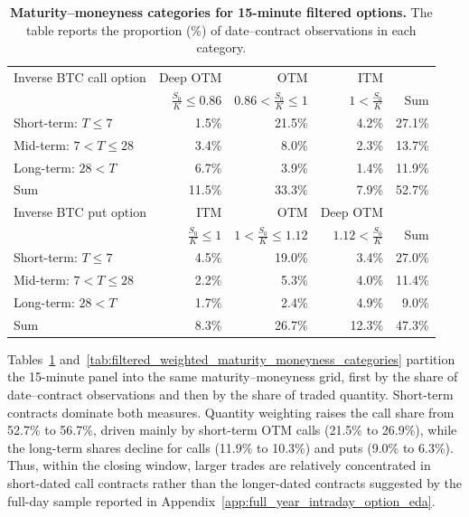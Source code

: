 \begin{table}[htbp]
\centering
\begin{tabular}{lrrrr}
\hline
Inverse BTC call option & Deep OTM & OTM & ITM & \\
 & $\frac{S_0}{K} \leq 0.86$ & $0.86 < \frac{S_0}{K} \leq 1$ & $1 < \frac{S_0}{K}$ & Sum \\
\hline
Short-term: $T \leq 7$ & 1.5\% & 21.5\% & 4.2\% & 27.1\% \\
Mid-term: $7 < T \leq 28$ & 3.4\% & 8.0\% & 2.3\% & 13.7\% \\
Long-term: $28 < T$ & 6.7\% & 3.9\% & 1.4\% & 11.9\% \\
Sum & 11.5\% & 33.3\% & 7.9\% & 52.7\% \\
\hline
Inverse BTC put option & ITM & OTM & Deep OTM & \\
 & $\frac{S_0}{K} \leq 1$ & $1 < \frac{S_0}{K} \leq 1.12$ & $1.12 < \frac{S_0}{K}$ & Sum \\
\hline
Short-term: $T \leq 7$ & 4.5\% & 19.0\% & 3.4\% & 27.0\% \\
Mid-term: $7 < T \leq 28$ & 2.2\% & 5.3\% & 4.0\% & 11.4\% \\
Long-term: $28 < T$ & 1.7\% & 2.4\% & 4.9\% & 9.0\% \\
Sum & 8.3\% & 26.7\% & 12.3\% & 47.3\% \\
\hline
\end{tabular}
\caption{\textbf{Maturity--moneyness categories for 15-minute filtered options.} The table reports the proportion (\%) of date--contract observations in each category.}
\label{tab:filtered_maturity_moneyness_categories}
\end{table}

Tables~\ref{tab:filtered_maturity_moneyness_categories} and~\ref{tab:filtered_weighted_maturity_moneyness_categories} partition the 15-minute panel into the same maturity--moneyness grid, first by the share of date--contract observations and then by the share of traded quantity. Short-term contracts dominate both measures. Quantity weighting raises the call share from 52.7\% to 56.7\%, driven mainly by short-term OTM calls (21.5\% to 26.9\%), while the long-term shares decline for calls (11.9\% to 10.3\%) and puts (9.0\% to 6.3\%). Thus, within the closing window, larger trades are relatively concentrated in short-dated call contracts rather than the longer-dated contracts suggested by the full-day sample reported in Appendix~\ref{app:full_year_intraday_option_eda}.


